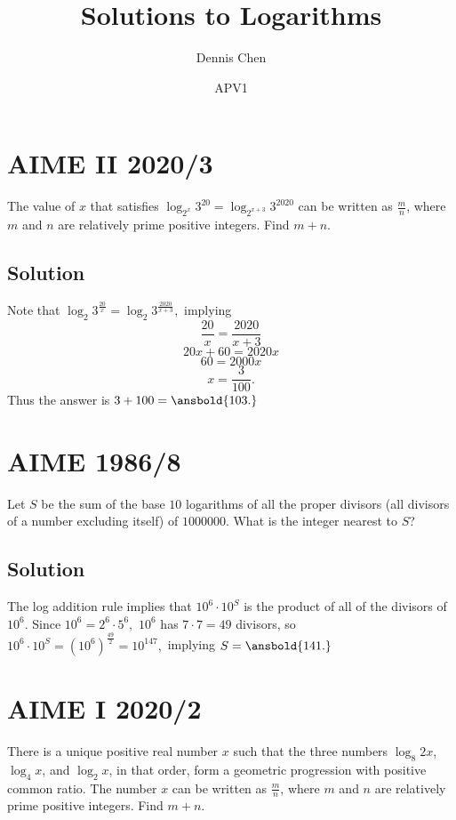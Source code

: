 \documentclass{article}
\title{Solutions to Logarithms}
\author{Dennis Chen}
\date{APV1}
\begin{document}
\maketitle

\toc

\pagebreak\section{AIME II 2020/3}

The value of $x$ that satisfies $\log_{2^x} 3^{20} = \log_{2^{x+3}} 3^{2020}$ can be written as $\frac{m}{n}$, where $m$ and $n$ are relatively prime positive integers. Find $m+n$.

\subsection{Solution}

Note that $\log_2{3}^\frac{20}{x}=\log_2{3}^\frac{2020}{x+3},$ implying
\[\frac{20}{x}=\frac{2020}{x+3}\]
\[20x+60=2020x\]
\[60=2000x\]
\[x=\frac{3}{100}.\]
Thus the answer is $3+100=\ansbold{103.}$

\pagebreak\section{AIME 1986/8}

Let $S$ be the sum of the base $10$ logarithms of all the proper divisors (all divisors of a number excluding itself) of $1000000$. What is the integer nearest to $S$?

\subsection{Solution}

The log addition rule implies that $10^6\cdot 10^S$ is the product of all of the divisors of $10^6.$ Since $10^6=2^6\cdot 5^6,$ $10^6$ has $7\cdot 7=49$ divisors, so $10^6\cdot 10^S=(10^6)^{\frac{49}{2}}=10^{147},$ implying $S=\ansbold{141.}$

\pagebreak\section{AIME I 2020/2}

There is a unique positive real number $x$ such that the three numbers $\log_8{2x}$, $\log_4{x}$, and $\log_2{x}$, in that order, form a geometric progression with positive common ratio. The number $x$ can be written as $\frac{m}{n}$, where $m$ and $n$ are relatively prime positive integers. Find $m + n$.
\end{document}
